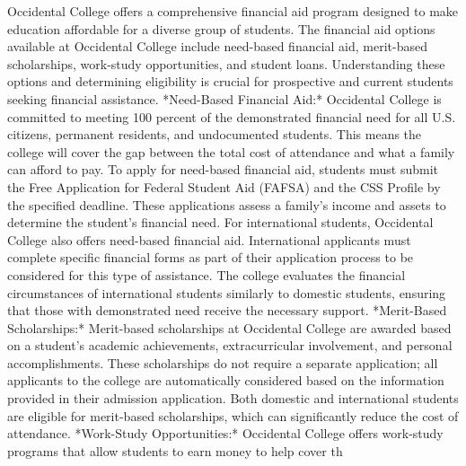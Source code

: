 \documentclass[10pt,twocolumn]{article}
\begin{document}
\begin{itemize}
Occidental College offers a comprehensive financial aid program designed to make education affordable for a diverse group of students. The financial aid options available at Occidental College include need-based financial aid, merit-based scholarships, work-study opportunities, and student loans. Understanding these options and determining eligibility is crucial for prospective and current students seeking financial assistance. *Need-Based Financial Aid:* Occidental College is committed to meeting 100 percent of the demonstrated financial need for all U.S. citizens, permanent residents, and undocumented students. This means the college will cover the gap between the total cost of attendance and what a family can afford to pay. To apply for need-based financial aid, students must submit the Free Application for Federal Student Aid (FAFSA) and the CSS Profile by the specified deadline. These applications assess a family's income and assets to determine the student's financial need.  For international students, Occidental College also offers need-based financial aid. International applicants must complete specific financial forms as part of their application process to be considered for this type of assistance. The college evaluates the financial circumstances of international students similarly to domestic students, ensuring that those with demonstrated need receive the necessary support.
*Merit-Based Scholarships:* Merit-based scholarships at Occidental College are awarded based on a student's academic achievements, extracurricular involvement, and personal accomplishments. These scholarships do not require a separate application; all applicants to the college are automatically considered based on the information provided in their admission application. Both domestic and international students are eligible for merit-based scholarships, which can significantly reduce the cost of attendance.
*Work-Study Opportunities:* Occidental College offers work-study programs that allow students to earn money to help cover th

\end{itemize}
\end{document}
